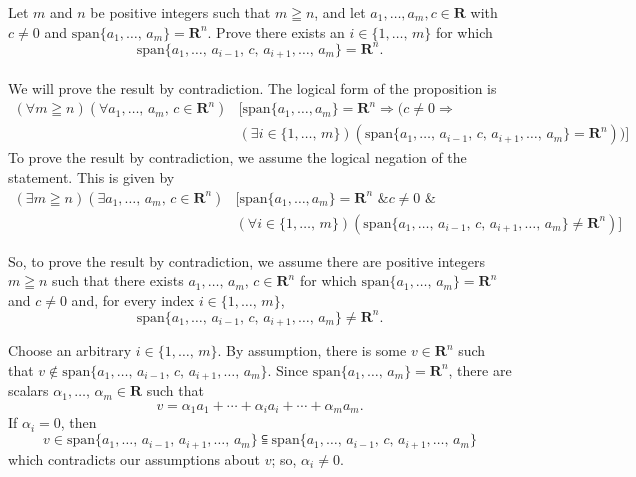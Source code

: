 \documentclass[a4paper,11pt]{article}
\newcommand{\R}{\mathbf{R}}
\begin{document}
 Let $m$ and $n$ be positive integers such that $m
\geqq n$, and let $a_1,\dots,a_m,c \in \R$ with $c \neq 0$ and
$\text{span}\{a_1,\dots,\,a_m\} = \R^n$. Prove there exists an $i \in
\{1,\dots,\,m\}$ for which
\[
  \text{span}\{a_1,\dots,\,a_{i-1},\,c,\,a_{i+1},\dots,\,a_m\} = \R^n.
\] \\

 We will prove the result by contradiction. The
logical form of the proposition is
\begin{align*}
  (\forall m \geqq n)(\forall a_1,\dots,\,a_m,\,c \in \R^n)
  &\Big[
  \text{span}\{a_1,\dots,a_m\}=\R^n \Rightarrow
  \Big(
  c \neq 0 \Rightarrow \\
  &(\exists i \in \{1,\dots,\,m\})
  (\text{span}\{a_1,\dots,\,a_{i-1},\,c,\,a_{i+1},\dots,\,a_m\} = \R^n)
  \Big)
  \Big]
\end{align*}
To prove the result by contradiction, we assume the logical negation of the
statement. This is given by
\begin{align*}
  (\exists m \geqq n)(\exists a_1,\dots,\,a_m,\,c \in \R^n)
  &\Big[
  \text{span}\{a_1,\dots,a_m\}=\R^n \text{ \& } c \neq 0 \text{ \& } \\
  &(\forall i \in \{1,\dots,\,m\})
  (\text{span}\{a_1,\dots,\,a_{i-1},\,c,\,a_{i+1},\dots,\,a_m\} \neq \R^n)
  \Big]
\end{align*}

So, to prove the result by contradiction, we assume there are positive integers
$m \geqq n$ such that there exists $a_1,\dots,\,a_m,\,c \in \R^n$ for which
$\text{span}\{a_1,\dots,\,a_m\} = \R^n$ and $c \neq 0$ and, for every index $i
\in \{1,\dots,\,m\}$,
\[
  \text{span}\{a_1,\dots,\,a_{i-1},\,c,\,a_{i+1},\dots,\,a_m\} \neq \R^n.
\]

Choose an arbitrary $i \in \{1,\dots,\,m\}$. By assumption, there is some $v \in
\R^n$ such that $v \notin
\text{span}\{a_1,\dots,\,a_{i-1},\,c,\,a_{i+1},\dots,\,a_m\}$. Since
$\text{span}\{a_1,\dots,\,a_m\} = \R^n$, there are scalars
$\alpha_1,\dots,\,\alpha_m \in \R$ such that
\[
  v = \alpha_1a_1 + \cdots + \alpha_ia_i + \cdots + \alpha_ma_m.
\]
If $\alpha_i = 0$, then
\[
  v \in \text{span}\{a_1,\dots,\,a_{i-1},\,a_{i+1},\dots,\,a_m\}
    \subseteqq
    \text{span}\{a_1,\dots,\,a_{i-1},\,c,\,a_{i+1},\dots,\,a_m\}
\]
which contradicts our assumptions about $v$; so, $\alpha_i \neq 0$.
\end{document}
